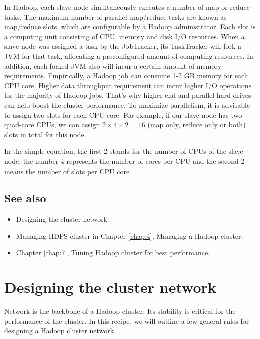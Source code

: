 In Hadoop, each slave node simultaneously executes a number of map or reduce tasks. The maximum number of parallel map/reduce tasks are known as map/reduce slots, which are configurable by a Hadoop administrator. Each slot is a computing unit consisting of CPU, memory and disk I/O resources. When a slave node was assigned a task by the JobTracker, its TaskTracker will fork a JVM for that task, allocating a preconfigured amount of computing resources. In addition, each forked JVM also will incur a certain amount of memory requirements. Empirically, a Hadoop job can consume 1-2 GB memory for each CPU core. Higher data throughput requirement can incur higher I/O operations for the majority of Hadoop jobs. That's why higher end and parallel hard drives can help boost the cluster performance. To maximize parallelism, it is advisable to assign two slots for each CPU core. For example, if our slave node has two quad-core CPUs, we can assign $2 \times 4 \times 2 = 16$ (map only, reduce only or both) slots in total for this node.

In the simple equation, the first 2 stands for the number of CPUs of the slave node, the number 4 represents the number of cores per CPU and the second 2 means the number of slots per CPU core.
\subsection*{See also}
\begin{itemize}
  \item Designing the cluster network
  \item Managing HDFS cluster in Chapter \ref{chap:4}, Managing a Hadoop cluster.
  \item Chapter \ref{chap:7}, Tuning Hadoop cluster for best performance.
\end{itemize}

\section{Designing the cluster network}
Network is the backbone of a Hadoop cluster. Its stability is critical for the performance of the cluster. In this recipe, we will outline a few general rules for designing a Hadoop cluster network.
